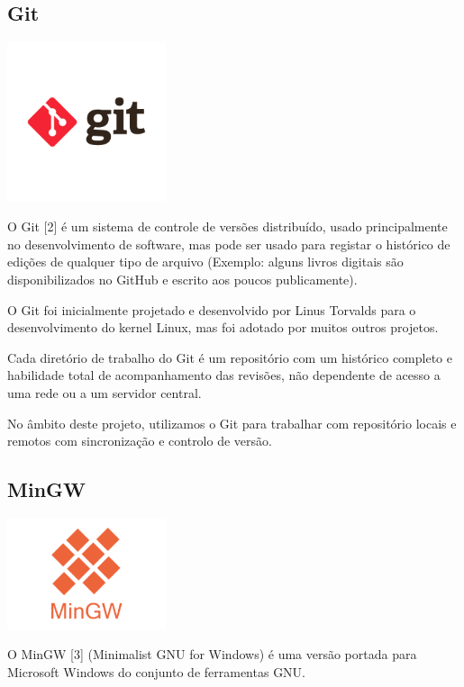 \documentclass[a4paper,12pt]{article}
\begin{document}
\newpage

\subsection{Git}
    \includegraphics[width=0.35\textwidth]{git.png} %
    \vspace{0.5cm}

O Git [2] é um sistema de controle de versões distribuído, usado principalmente no desenvolvimento de software, mas pode ser usado para registar o histórico de edições de qualquer tipo de arquivo (Exemplo: alguns livros digitais são disponibilizados no GitHub e escrito aos poucos publicamente).

O Git foi inicialmente projetado e desenvolvido por Linus Torvalds para o desenvolvimento do kernel Linux, mas foi adotado por muitos outros projetos.

Cada diretório de trabalho do Git é um repositório com um histórico completo e habilidade total de acompanhamento das revisões, não dependente de acesso a uma rede ou a um servidor central.

No âmbito deste projeto, utilizamos o Git para trabalhar com repositório locais e remotos com sincronização e controlo de versão.

\subsection{MinGW}
    \includegraphics[width=0.35\textwidth]{mingw.png} %
    \vspace{0.5cm}

O MinGW [3] (Minimalist GNU for Windows) é uma versão portada para Microsoft Windows do conjunto de ferramentas GNU. 
\end{document}
